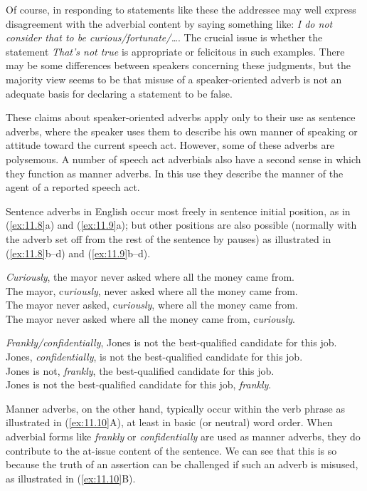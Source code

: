 Of course, in responding to statements like these the addressee may well express disagreement with the adverbial content by saying something like: \textit{I do not consider that to be curious/fortunate/…}. The crucial issue is whether the statement \textit{That’s not true} is appropriate or felicitous in such examples. There may be some differences between speakers concerning these judgments, but the majority view seems to be that misuse of a speaker-oriented adverb is not an adequate basis for declaring a statement to be false.


These claims about speaker-oriented adverbs apply only to their use as sentence adverbs, where the speaker uses them to describe his own manner of speaking or attitude toward the current speech act. However, some of these adverbs are polysemous. A number of speech act adverbials also have a second sense in which they function as manner adverbs. In this use they describe the manner of the agent of a reported speech act.


Sentence adverbs in English occur most freely in sentence initial position, as in (\ref{ex:11.8}a) and (\ref{ex:11.9}a); but other positions are also possible (normally with the adverb set off from the rest of the sentence by pauses) as illustrated in (\ref{ex:11.8}b--d) and (\ref{ex:11.9}b--d).


\ea \label{ex:11.8}
\ea \textit{Curiously}, the mayor never asked where all the money came from.\\
\ex The mayor, c\textit{uriously}, never asked where all the money came from.\\
\ex The mayor never asked, c\textit{uriously}, where all the money came from.\\
\ex The mayor never asked where all the money came from, c\textit{uriously}.
                       \z
\z

\ea \label{ex:11.9}
\ea \textit{Frankly/confidentially}, Jones is not the best-qualified candidate for this job.\\
\ex Jones, \textit{confidentially}, is not the best-qualified candidate for this job.\\
\ex Jones is not, \textit{frankly}, the best-qualified candidate for this job.\\
\ex Jones is not the best-qualified candidate for this job, \textit{frankly}.
                       \z
\z

Manner adverbs, on the other hand, typically occur within the verb phrase as illustrated in (\ref{ex:11.10}A), at least in basic (or neutral) word order. When adverbial forms like \textit{frankly} or \textit{confidentially} are used as manner adverbs, they do contribute to the at-issue content of the sentence. We can see that this is so because the truth of an assertion can be challenged if such an adverb is misused, as illustrated in (\ref{ex:11.10}B).



